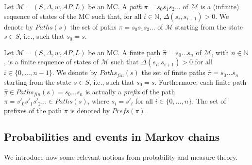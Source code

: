 \begin{definition} Let $\mathcal{M} = (S, \Delta, w, AP, L)$ be an MC.
A \textit{path} $\pi = s_0 s_1 s_2 \dots$ of $\mathcal{M}$ is a (infinite) sequence of states of the MC such that, for all $i \in \mathbb{N}$, $\Delta(s_i, s_{i+1})> 0$. We denote by $Paths(s)$ the set of paths $\pi = s_0s_1s_2\dots$ of $\mathcal{M}$ starting from the state $s \in S$, i.e., such that $s_0 = s$.
\end{definition}
\begin{definition}
Let $\mathcal{M} = (S, \Delta, w, AP, L)$ be an MC.
A finite path $\hat{\pi} = s_0 \dots s_n$ of $\mathcal{M}$, with $n \in \mathbb{N}$, is a finite sequence of states of $\mathcal{M}$ such that $\Delta(s_i, s_{i+1}) > 0$ for all $i \in \{0, \dots, n-1\}$.
We denote by $Paths_{fin}(s)$ the set of finite paths $\hat{\pi} = s_0 \dots s_n$ starting from the state $s \in S$, i.e., such that $s_0 = s$. Furthermore, each finite path $\hat{\pi}\in Paths_{fin}(s) = s_0\dots s_n$ is actually a \textit{prefix} of the path
$\pi = s'_0s'_1s'_2 \dots \in Paths(s)$, where $s_i = s'_i$ for all $i \in \{0, \dots, n\}$. The set of prefixes of the path $\pi$ is denoted by $Prefs(\pi)$.
\end{definition}

\subsection{Probabilities and events in Markov chains}
We introduce now some relevant notions from probability and measure theory.

